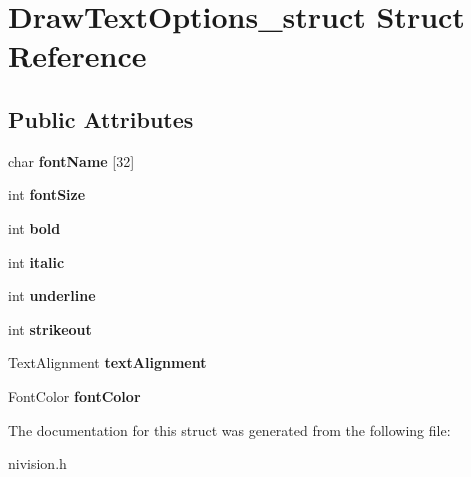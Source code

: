 \hypertarget{structDrawTextOptions__struct}{\section{\-Draw\-Text\-Options\-\_\-struct \-Struct \-Reference}
\label{structDrawTextOptions__struct}
}
\subsection*{\-Public \-Attributes}
\begin{DoxyCompactItemize}
\item 
\hypertarget{structDrawTextOptions__struct_a62787bff0fecd50d9afe1db180fc2042}{char {\bfseries font\-Name} \mbox{[}32\mbox{]}}\label{structDrawTextOptions__struct_a62787bff0fecd50d9afe1db180fc2042}

\item 
\hypertarget{structDrawTextOptions__struct_a435c09bbdb321c2c1123ed07e16d2964}{int {\bfseries font\-Size}}\label{structDrawTextOptions__struct_a435c09bbdb321c2c1123ed07e16d2964}

\item 
\hypertarget{structDrawTextOptions__struct_a0fc9b68d5781e17e3fc5451f6c351998}{int {\bfseries bold}}\label{structDrawTextOptions__struct_a0fc9b68d5781e17e3fc5451f6c351998}

\item 
\hypertarget{structDrawTextOptions__struct_a695e1a37a31518d6862d049366452034}{int {\bfseries italic}}\label{structDrawTextOptions__struct_a695e1a37a31518d6862d049366452034}

\item 
\hypertarget{structDrawTextOptions__struct_a4f0acfe0eaa6535c90d747c431975890}{int {\bfseries underline}}\label{structDrawTextOptions__struct_a4f0acfe0eaa6535c90d747c431975890}

\item 
\hypertarget{structDrawTextOptions__struct_ae24aab62094e72f0598bdc94fcbcbcff}{int {\bfseries strikeout}}\label{structDrawTextOptions__struct_ae24aab62094e72f0598bdc94fcbcbcff}

\item 
\hypertarget{structDrawTextOptions__struct_a1f88e1847c68e5270d7b1523bbfa11e9}{\-Text\-Alignment {\bfseries text\-Alignment}}\label{structDrawTextOptions__struct_a1f88e1847c68e5270d7b1523bbfa11e9}

\item 
\hypertarget{structDrawTextOptions__struct_a97ef97d5a432a76f898c51aa2eee6e68}{\-Font\-Color {\bfseries font\-Color}}\label{structDrawTextOptions__struct_a97ef97d5a432a76f898c51aa2eee6e68}

\end{DoxyCompactItemize}


\-The documentation for this struct was generated from the following file\-:\begin{DoxyCompactItemize}
\item 
nivision.\-h\end{DoxyCompactItemize}
